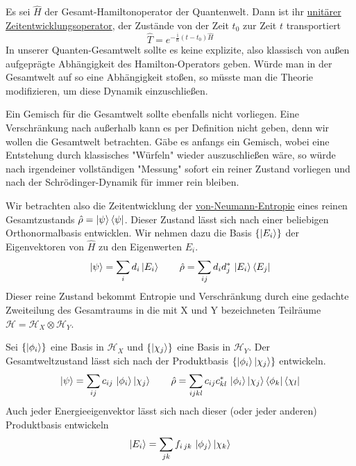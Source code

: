 \documentclass[12pt]{article}
\begin{document}
Es sei $\hat{H}$ der Gesamt-Hamiltonoperator der Quantenwelt. Dann ist ihr \href{https://de.wikipedia.org/wiki/Zeitentwicklungsoperator}{unitärer Zeitentwicklungsoperator}, der Zustände von der Zeit $t_0$ zur Zeit $t$ transportiert
\begin{equation}
\label{eq:propagator}
\hat{T}=e^{-\frac{\mathrm i}{\hbar}(t-t_0)\hat{H}}
\end{equation}
In unserer Quanten-Gesamtwelt sollte es keine explizite, also klassisch von außen aufgeprägte Abhängigkeit des Hamilton-Operators geben. Würde man in der Gesamtwelt auf so eine Abhängigkeit stoßen, so müsste man die Theorie modifizieren, um diese Dynamik einzuschließen.

Ein Gemisch für die Gesamtwelt sollte ebenfalls nicht vorliegen. Eine Verschränkung nach außerhalb kann es per Definition nicht geben, denn wir wollen die Gesamtwelt betrachten. Gäbe es anfangs ein Gemisch, wobei eine Entstehung durch klassisches "Würfeln" wieder auszuschließen wäre, so würde nach irgendeiner vollständigen "Messung" sofort ein reiner Zustand vorliegen und nach der Schrödinger-Dynamik für immer rein bleiben. 

Wir betrachten also die Zeitentwicklung der \href{https://de.wikipedia.org/wiki/Entropie#Von-Neumann-Entropie}{von-Neumann-Entropie} eines reinen Gesamtzustands $\hat{\rho}=\ket{\psi}\bra{\psi}$. Dieser Zustand lässt sich nach einer beliebigen Orthonormalbasis entwicklen. Wir nehmen dazu die Basis $\{\ket{E_i}\}$ der Eigenvektoren von $\hat{H}$ zu den Eigenwerten $E_i$.
\begin{equation}
\label{eq:psi_energy}
\ket{\psi}=\sum_{i}d_{i}\ket{E_i} \quad\quad
\hat{\rho}=\sum_{ij}d_{i}d_{j}^*\, \ket{E_i}\bra{E_j}
\end{equation}
Dieser reine Zustand bekommt Entropie und Verschränkung durch eine gedachte Zweiteilung des Gesamtraums in die mit X und Y bezeichneten Teilräume $\mathscr{H} = \mathscr{H}_X\otimes\mathscr{H}_Y$.

Sei $\{\ket{\phi_i}\}$ eine Basis in $\mathscr{H}_X$ und $\{\ket{\chi_j}\}$ eine Basis in $\mathscr{H}_Y$. Der Gesamtweltzustand lässt sich nach der Produktbasis $\{\ket{\phi_i}\ket{\chi_j}\}$ entwickeln.
\begin{equation}
\label{eq:psi_product}
\ket{\psi}=\sum_{ij}c_{ij}\, \ket{\phi_i}\ket{\chi_j} \quad\quad
\hat{\rho}=\sum_{ijkl}c_{ij}c_{kl}^*\, \ket{\phi_i}\ket{\chi_j}\bra{\phi_k}\bra{\chi_l}
\end{equation}
Auch jeder Energieeigenvektor lässt sich nach dieser (oder jeder anderen) Produktbasis entwickeln
\begin{equation}
\label{eq:energy_eigenvector}
\ket{E_i}=\sum_{jk}f_{i\,jk}\, \ket{\phi_j}\ket{\chi_k}
\end{equation}
\end{document}
